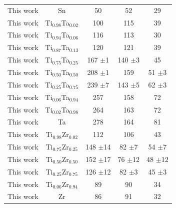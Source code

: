 \begin{longtable}[H]{ c c c c c}
	This work & Sn & 50 & 52 & 29\\
	This work & Ti$_{0.98}$Ta$_{0.02}$ & 100 & 115 & 39 \\
	This work & Ti$_{0.94}$Ta$_{0.06}$ & 116 & 113 & 30 \\
	This work & Ti$_{0.87}$Ta$_{0.13}$ & 120 & 121 & 39 \\
	This work & Ti$_{0.75}$Ta$_{0.25}$ & 167 $\pm$1 & 140 $\pm$3 & 45\\
	This work & Ti$_{0.50}$Ta$_{0.50}$ & 208 $\pm$1 & 159 & 51 $\pm$3\\
	This work & Ti$_{0.25}$Ta$_{0.75}$ & 239 $\pm$7 & 143 $\pm$5 & 62 $\pm$3\\
	This work & Ti$_{0.06}$Ta$_{0.94}$ & 257 & 158 & 72\\
	This work & Ti$_{0.02}$Ta$_{0.98}$ & 264 & 163 & 72\\
	This work & Ta & 278 & 164 & 81\\
	This work & Ti$_{0.98}$Zr$_{0.02}$ & 112 & 106 & 43\\
	This work & Ti$_{0.75}$Zr$_{0.25}$ & 148 $\pm$14 & 82 $\pm$7 & 54 $\pm$7\\
	This work & Ti$_{0.50}$Zr$_{0.50}$ & 152 $\pm$17 & 76 $\pm$12 & 48 $\pm$12\\
	This work & Ti$_{0.25}$Zr$_{0.75}$ & 126 $\pm$12 & 82 $\pm$3 & 45 $\pm$3\\
	This work & Ti$_{0.06}$Zr$_{0.94}$ & 89 & 90 & 34\\
	This work & Zr & 86 & 91 & 32\\
\end{longtable}

